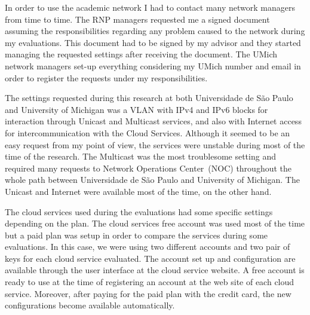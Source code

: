 In order to use the academic network I had to contact many network managers from time to time.
The RNP managers requested me a signed document assuming the responsibilities regarding any problem caused to the network during my evaluations.
This document had to be signed by my advisor and they started managing the requested settings after receiving the document.
The UMich network managers set-up everything considering my UMich number and email in order to register the requests under my responsibilities.

The settings requested during this research at both Universidade de São Paulo and University of Michigan was a VLAN with IPv4 and IPv6 blocks for interaction through Unicast and Multicast services, and also with Internet access for intercommunication with the Cloud Services.
Although it seemed to be an easy request from my point of view, the services were unstable during most of the time of the research.
The Multicast was the most troublesome setting and required many requests to Network Operations Center~(NOC) throughout the whole path between Universidade de São Paulo and University of Michigan.
The Unicast and Internet were available most of the time, on the other hand.





The cloud services used during the evaluations had some specific settings depending on the plan. 
The cloud services free account was used most of the time but a paid plan was setup in order to compare the services during some evaluations.
In this case, we were using two different accounts and two pair of keys for each cloud service evaluated.
The account set up and configuration are available through the user interface at the cloud service website.
A free account is ready to use at the time of registering an account at the web site of each cloud service.
Moreover, after paying for the paid plan with the credit card, the new configurations become available automatically.

